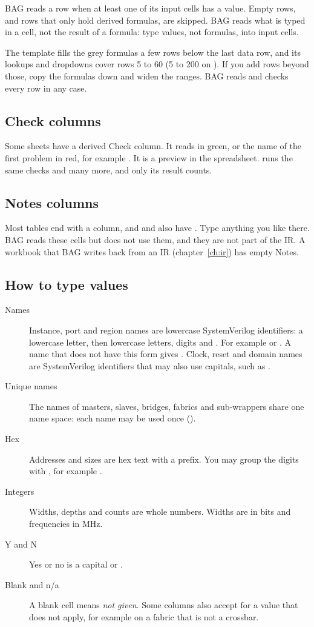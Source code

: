 BAG reads a row when at least one of its input cells has a value. Empty rows, and rows
that only hold derived formulas, are skipped. BAG reads what is typed in a cell, not the
result of a formula: type values, not formulas, into input cells.

The template fills the grey formulas a few rows below the last data row, and its lookups
and dropdowns cover rows 5 to 60 (5 to 200 on ). If you add rows
beyond those, copy the formulas down and widen the ranges. BAG reads and checks every
row in any case.

\subsection{Check columns}

Some sheets have a derived \textsf{Check} column. It reads  in green, or the name
of the first problem in red, for example . It is a preview in the
spreadsheet.  runs the same checks and many more, and only its result
counts.

\subsection{Notes columns}

Most tables end with a  column, and  and  also
have . Type anything you like there. BAG reads these cells but does not
use them, and they are not part of the IR. A workbook that BAG writes back from an IR
(chapter~\ref{ch:ir}) has empty Notes.

\subsection{How to type values}

\begin{description}
\item[Names] Instance, port and region names are lowercase SystemVerilog identifiers: a
  lowercase letter, then lowercase letters, digits and \code{_}. For example
   or . A name that does not have this form gives
  . Clock, reset and domain names are SystemVerilog identifiers that
  may also use capitals, such as .
\item[Unique names] The names of masters, slaves, bridges, fabrics and sub-wrappers
  share one name space: each name may be used once ().
\item[Hex] Addresses and sizes are hex text with a  prefix. You may group the
  digits with \code{_}, for example .
\item[Integers] Widths, depths and counts are whole numbers. Widths are in bits and
  frequencies in MHz.
\item[Y and N] Yes or no is a capital  or .
\item[Blank and n/a] A blank cell means \emph{not given}. Some columns also accept
   for a value that does not apply, for example  on a fabric
  that is not a crossbar.
\end{description}

